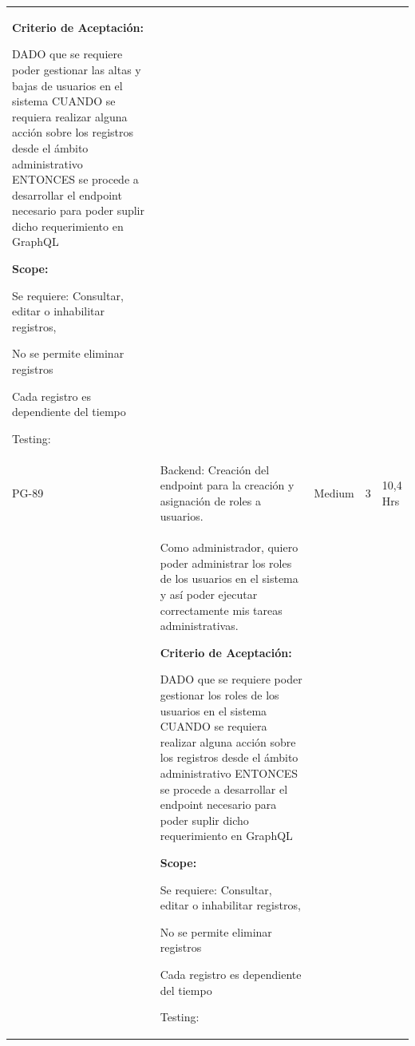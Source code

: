 \documentclass[11pt]{charter}
\begin{document}
\begin{landscape}
\begin{tabularx}{\linewidth}{@{}|p{1.3cm}|p{17cm}|p{1.7cm}|p{1.5cm}|p{1.7cm}|@{}}
\begin{description}
                   \item \textbf{Criterio de Aceptación:}                 
                   \item DADO que se requiere poder gestionar las altas y bajas de usuarios en el   sistema CUANDO se requiera realizar alguna acción sobre los registros desde el   ámbito administrativo ENTONCES se procede a desarrollar el endpoint necesario para poder suplir dicho requerimiento en GraphQL                
                   \item \textbf{Scope:}                  
                         \item Se requiere: Consultar, editar o inhabilitar registros, 
                         \item No se permite eliminar registros 
                         \item Cada registro es dependiente del tiempo                 
                   \item Testing:
            \end{description}     &  &     & \\
PG-89    & Backend: Creación del endpoint   para la creación y asignación de roles a usuarios.  & Medium             & 3   & 10,4  Hrs         \\
         &  \begin{description}                 
                   \item Como administrador, quiero poder   administrar los roles de los usuarios en el sistema y así poder ejecutar   correctamente mis tareas administrativas.                 
                   \item \textbf{Criterio de Aceptación:}                 
                   \item DADO que se requiere poder gestionar los roles de los usuarios en el   sistema CUANDO se requiera realizar alguna acción sobre los registros desde el   ámbito administrativo ENTONCES se procede a desarrollar el endpoint necesario para poder suplir dicho requerimiento en GraphQL                
                   \item \textbf{Scope:}                  
                         \item Se requiere: Consultar, editar o inhabilitar registros, 
                         \item No se permite eliminar registros 
                         \item Cada registro es dependiente del tiempo                 
                   \item Testing:

\end{description}
\end{tabularx}
\end{landscape}
\end{document}
